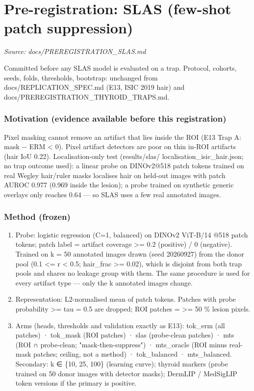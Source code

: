 \section{Pre-registration: SLAS (few-shot patch suppression)}\label{doc:PREREGISTRATION_SLAS}
\noindent\textit{Source: docs/PREREGISTRATION\_SLAS.md}

{\small
Committed before any SLAS model is evaluated on a trap. Protocol, cohorts, seeds, folds, thresholds, bootstrap:
unchanged from docs/REPLICATION\_SPEC.md (E13, ISIC 2019 hair) and docs/PREREGISTRATION\_THYROID\_TRAPS.md.

\subsubsection{Motivation (evidence available before this registration)}\label{motivation-evidence-available-before-this-registration}

Pixel masking cannot remove an artifact that lies inside the ROI (E13 Trap A: mask − ERM \textless{} 0). Pixel artifact
detectors are poor on thin in-ROI artifacts (hair IoU 0.22). Localisation-only test (results/slas/
localisation\_isic\_hair.json; no trap outcome used): a linear probe on DINOv2@518 patch tokens trained on real
Wegley hair/ruler masks localises hair on held-out images with patch AUROC 0.977 (0.969 inside the lesion);
a probe trained on synthetic generic overlays only reaches 0.64 --- so SLAS uses a few real annotated images.

\subsubsection{Method (frozen)}\label{method-frozen}

\begin{enumerate}
\def\labelenumi{\arabic{enumi}.}

\item
  Probe: logistic regression (C=1, balanced) on DINOv2 ViT-B/14 @518 patch tokens; patch label = artifact
  coverage \textgreater= 0.2 (positive) / 0 (negative). Trained on k = 50 annotated images drawn (seed 20260927) from the
  donor pool (0.1 \textless= r \textless{} 0.5; hair\_frac \textgreater= 0.02), which is disjoint from both trap pools and shares no leakage
  group with them. The same procedure is used for every artifact type --- only the k annotated images change.
\item
  Representation: L2-normalised mean of patch tokens. Patches with probe probability \textgreater= tau = 0.5 are dropped;
  ROI patches = \textgreater= 50 \% lesion pixels.
\item
  Arms (heads, thresholds and validation exactly as E13):
  tok\_erm (all patches) · tok\_mask (ROI patches) · slas (probe-clean patches) · mts (ROI ∩ probe-clean;
  "mask-then-suppress") · mts\_oracle (ROI minus real-mask patches; ceiling, not a method) ·
  tok\_balanced · mts\_balanced.
  Secondary: k ∈ \{10, 25, 100\} (learning curve); thyroid markers (probe trained on 50 donor images with detector
  masks); DermLIP / MedSigLIP token versions if the primary is positive.
\end{enumerate}

}
